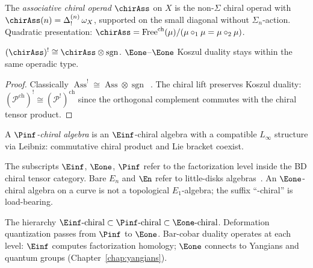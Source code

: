 \begin{definition}
\label{def:chiral-ass-operad}
The \emph{associative chiral operad} $\chirAss$ on $X$ is the
non-$\Sigma$ chiral operad with
$\chirAss(n) = \Delta^{(n)}_!\, \omega_X$, supported on the small
diagonal without $\Sigma_n$-action.  Quadratic presentation:
$\chirAss = \operatorname{Free}^{\mathrm{ch}}(\mu) /
(\mu \circ_1 \mu = \mu \circ_2 \mu)$.
\end{definition}

\begin{proposition}
\label{prop:chirAss-self-dual}
$(\chirAss)^! \cong \chirAss \otimes \operatorname{sgn}$.
$\Eone$--$\Eone$ Koszul duality stays within the same operadic
type.
\end{proposition}
\begin{proof}
Classically $\operatorname{Ass}^! \cong \operatorname{Ass} \otimes
\operatorname{sgn}$~\cite[Theorem~7.4.1]{LV12}.  The chiral lift
preserves Koszul duality:
$(\mathcal{P}^{\mathrm{ch}})^! \cong (\mathcal{P}^!)^{\mathrm{ch}}$
since the orthogonal complement commutes with the chiral tensor
product.
\end{proof}

\begin{definition}[\texorpdfstring{$\Pinf$}{P-infinity}-chiral algebra = chiral Poisson]
\label{def:pinf-chiral}
A \emph{$\Pinf$-chiral algebra} is an $\Einf$-chiral algebra with
a compatible $L_\infty$ structure via Leibniz: commutative chiral
product and Lie bracket coexist.
\end{definition}

\begin{remark}\label{rem:En-terminology}
The subscripts $\Einf$, $\Eone$, $\Pinf$ refer to the
factorization level inside the BD chiral tensor category.  Bare
$E_n$ and $\En$ refer to little-disks
algebras~\cite[\S5.1]{HA}.  An $\Eone$-chiral algebra on a
curve is not a topological $E_1$-algebra; the suffix
``-chiral'' is load-bearing.
\end{remark}

The hierarchy
$\Einf\text{-chiral} \subset \Pinf\text{-chiral} \subset
\Eone\text{-chiral}$.
Deformation quantization passes from $\Pinf$ to $\Eone$.
Bar-cobar duality operates at each level: $\Einf$ computes
factorization homology; $\Eone$ connects to Yangians and quantum
groups (Chapter~\ref{chap:yangians}).

